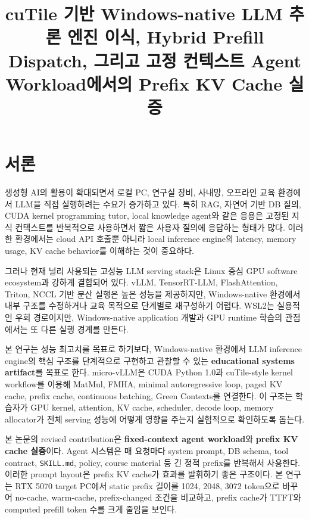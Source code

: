 \documentclass{kcc}
\title{cuTile 기반 Windows-native LLM 추론 엔진 이식, Hybrid Prefill Dispatch, 그리고 고정 컨텍스트 Agent Workload에서의 Prefix KV Cache 실증}
\author{}
\begin{document}
\maketitle

\section{서론}
생성형 AI의 활용이 확대되면서 로컬 PC, 연구실 장비, 사내망, 오프라인 교육 환경에서 LLM을 직접 실행하려는 수요가 증가하고 있다. 특히 RAG, 자연어 기반 DB 질의, CUDA kernel programming tutor, local knowledge agent와 같은 응용은 고정된 지식 컨텍스트를 반복적으로 사용하면서 짧은 사용자 질의에 응답하는 형태가 많다. 이러한 환경에서는 cloud API 호출뿐 아니라 local inference engine의 latency, memory usage, KV cache behavior를 이해하는 것이 중요하다.

그러나 현재 널리 사용되는 고성능 LLM serving stack은 Linux 중심 GPU software ecosystem과 강하게 결합되어 있다. vLLM, TensorRT-LLM, FlashAttention, Triton, NCCL 기반 분산 실행은 높은 성능을 제공하지만, Windows-native 환경에서 내부 구조를 수정하거나 교육 목적으로 단계별로 재구성하기 어렵다. WSL2는 실용적인 우회 경로이지만, Windows-native application 개발과 GPU runtime 학습의 관점에서는 또 다른 실행 경계를 만든다.

본 연구는 성능 최고치를 목표로 하기보다, Windows-native 환경에서 LLM inference engine의 핵심 구조를 단계적으로 구현하고 관찰할 수 있는 \textbf{educational systems artifact}를 목표로 한다. micro-vLLM은 CUDA Python 1.0과 cuTile-style kernel workflow를 이용해 MatMul, FMHA, minimal autoregressive loop, paged KV cache, prefix cache, continuous batching, Green Contexts를 연결한다. 이 구조는 학습자가 GPU kernel, attention, KV cache, scheduler, decode loop, memory allocator가 전체 serving 성능에 어떻게 영향을 주는지 실험적으로 확인하도록 돕는다.

본 논문의 revised contribution은 \textbf{fixed-context agent workload}와 \textbf{prefix KV cache 실증}이다. Agent 시스템은 매 요청마다 system prompt, DB schema, tool contract, \texttt{SKILL.md}, policy, course material 등 긴 정적 prefix를 반복해서 사용한다. 이러한 prompt layout은 prefix KV cache가 효과를 발휘하기 좋은 구조이다. 본 연구는 RTX 5070 target PC에서 static prefix 길이를 1024, 2048, 3072 token으로 바꾸어 no-cache, warm-cache, prefix-changed 조건을 비교하고, prefix cache가 TTFT와 computed prefill token 수를 크게 줄임을 보인다.
\end{document}
